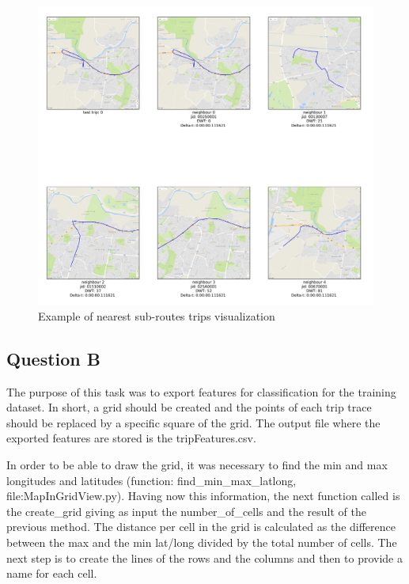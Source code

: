 \documentclass[12pt]{article}
\begin{document}
	\begin{figure} [H]
		\begin{center}
			\includegraphics [scale = 0.50] {question2a1example.jpg}
			\caption{Example of nearest sub-routes trips visualization}
		\end{center}
	\end{figure} 
	
	\subsection{Question B}
	The purpose of this task was to export features for classification for the training dataset. In short, a grid should be created and the points of each trip trace should be replaced by a specific square of the grid. The output file where the exported features are stored is the tripFeatures.csv.
	
	In order to be able to draw the grid, it was necessary to find the min and max longitudes and latitudes (function: find\_min\_max\_latlong, file:MapInGridView.py). Having now this information, the next function called is the create\_grid giving as input the number\_of\_cells and the result of the previous method. The distance per cell in the grid is calculated as the difference between the max and the min lat/long divided by the total number of cells. The next step is to create the lines of the rows and the columns and then to provide a name for each cell.
	
\end{document}
